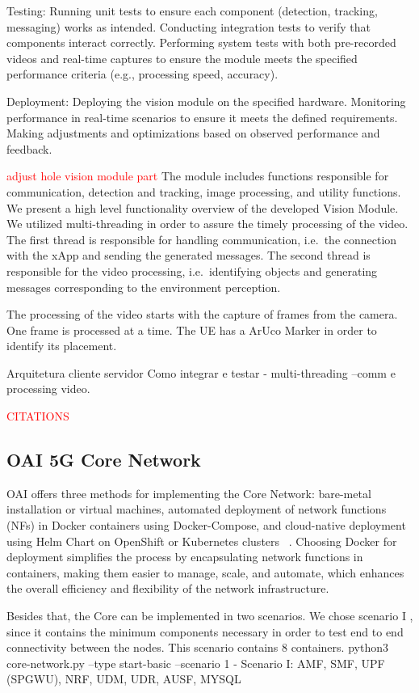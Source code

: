     Testing:
        Running unit tests to ensure each component (detection, tracking, messaging) works as intended.
        Conducting integration tests to verify that components interact correctly.
        Performing system tests with both pre-recorded videos and real-time captures to ensure the module meets the specified performance criteria (e.g., processing speed, accuracy).

    Deployment:
        Deploying the vision module on the specified hardware.
        Monitoring performance in real-time scenarios to ensure it meets the defined requirements.
        Making adjustments and optimizations based on observed performance and feedback.

\textcolor{red}{adjust hole vision module part}
The module includes functions responsible for communication, detection and tracking, image processing, and utility functions.
We present a high level functionality overview of the developed Vision Module.
We utilized multi-threading in order to assure the timely processing of the video.
The first thread is responsible for handling communication, i.e.\ the connection with the xApp and sending the generated messages.
The second thread is responsible for the video processing, i.e.\ identifying objects and generating messages corresponding to the environment perception.

The processing of the video starts with the capture of frames from the camera.
One frame is processed at a time.
The UE has a ArUco Marker in order to identify its placement.

Arquitetura cliente servidor
Como integrar e testar - multi-threading  --comm e processing video.

\textcolor{red}{CITATIONS}
\subsection{OAI 5G Core Network}\label{subsec:oai-5g-core-network}
OAI offers three methods for implementing the Core Network: bare-metal installation or virtual machines, automated deployment of network functions (NFs) in Docker containers using Docker-Compose, and cloud-native deployment using Helm Chart on OpenShift or Kubernetes clusters ~\cite{}.
Choosing Docker for deployment simplifies the process by encapsulating network functions in containers, making them easier to manage, scale, and automate, which enhances the overall efficiency and flexibility of the network infrastructure.

Besides that, the Core can be implemented in two scenarios.
We chose scenario I , since it contains the minimum components necessary in order to test end to end connectivity between the nodes.
This scenario contains 8 containers.
python3 core-network.py --type start-basic --scenario 1
- Scenario I:  AMF, SMF, UPF (SPGWU), NRF, UDM, UDR, AUSF, MYSQL

